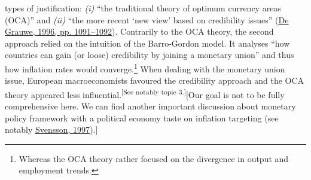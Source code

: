 \documentclass[]{elsarticle} %
\begin{document}
types of justification: \emph{(i)} ``the traditional theory of optimum
currency areas (OCA)'' and \emph{(ii)} ``the more recent `new view'
based on credibility issues'' (\protect\hyperlink{ref-degrauwe1996}{De
Grauwe, 1996, pp. 1091--1092}). Contrarily to the OCA theory, the second
approach relied on the intuition of the Barro-Gordon model. It analyses
``how countries can gain (or loose) credibility by joining a monetary
union'' and thus how inflation rates would converge.\footnote{Whereas
  the OCA theory rather focused on the divergence in output and
  employment trends.} When dealing with the monetary union issue,
European macroeconomists favoured the credibility approach and the OCA
theory appeared less influential.\textsuperscript{{[}See notably topic
3.{]}}{[}Our goal is not to be fully comprehensive here. We can find
another important discussion about monetary policy framework with a
political economy taste on inflation targeting (see notably
\protect\hyperlink{ref-svensson1997}{Svensson, 1997}).{]}
\end{document}
